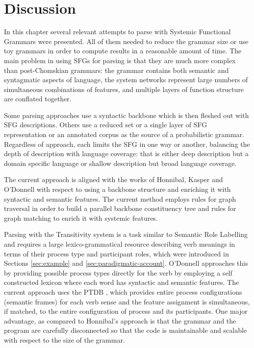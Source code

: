 \section{Discussion}
In this chapter several relevant attempts to parse with Systemic Functional Grammars were presented. All of them needed to reduce the grammar size or use toy grammars in order to compute results in a reasonable amount of time. The main problem in using SFGs for parsing is that they are much more complex than post-Chomskian grammars: the grammar contains both semantic and syntagmatic aspects of language, the system networks represent large numbers of simultaneous combinations of features, and multiple layers of function structure are conflated together. 

Some parsing approaches use a syntactic backbone which is then fleshed out with SFG descriptions. Others use a reduced set or a single layer of SFG representation or an annotated corpus as the source of a probabilistic grammar. Regardless of approach, each limits the SFG in one way or another, balancing the depth of description with language coverage: that is either deep description but a domain specific language or shallow description but broad language coverage. 

The current approach is aligned with the works of Honnibal, Kasper and O'Donnell with respect to using a backbone structure and enriching it with syntactic and semantic features. The current method employs rules for graph traversal in order to build a parallel backbone constituency tree and rules for graph matching to enrich it with systemic features. 

Parsing with the Transitivity system is a task similar to Semantic Role Labelling and requires a large lexico-grammatical resource describing verb meanings in terms of their process type and participant roles, which were introduced in Sections \ref{sec:example} and \ref{sec:paradigmatic-account}. O'Donnell approaches this by providing possible process types directly for the verb by employing a self constructed lexicon where each word has syntactic and semantic features. The current approach uses the PTDB \citep{Neale2002}, which provides entire process configurations (semantic frames) for each verb sense and the feature assignment is simultaneous, if matched, to the entire configuration of process and its participants.
One major advantage, as compared to Honnibal's approach is that the grammar and the program are carefully disconnected so that the code is maintainable and scalable with respect to the size of the grammar. 

